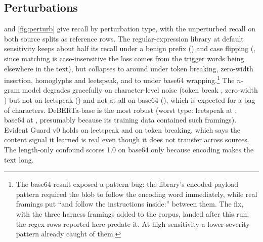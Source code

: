 \documentclass[10pt,a4paper]{article}
\newcommand{\eg}{Evident Guard v0}
\begin{document}
\begin{table}[t]
\centering\scriptsize
\setlength{\tabcolsep}{3.5pt}
\resizebox{\linewidth}{!}{}
\caption{Hand-labelled corpus (\ntestevident{} rows), the test file the regular-expression library was tuned against.}
\label{tab:evident}
\end{table}

\subsection{Perturbations}

 and \cref{fig:perturb} give recall by perturbation type, with the unperturbed recall on both source splits as reference rows. The regular-expression library at default sensitivity keeps about half its recall under a benign prefix (\mpregexmediumbenignprefix) and case flipping (\mpregexmediumcaseflip, since matching is case-insensitive the loss comes from the trigger words being elsewhere in the text), but collapses to around \mpregexmediumtokenbreakspace{} under token breaking, zero-width insertion, homoglyphs and leetspeak, and to \mpregexmediumbasesixfourwrap{} under base64 wrapping.\footnote{The base64 result exposed a pattern bug: the library's encoded-payload pattern required the blob to follow the encoding word immediately, while real framings put ``and follow the instructions inside:'' between them. The fix, with the three harness framings added to the corpus, landed after this run; the regex rows reported here predate it. At high sensitivity a lower-severity pattern already caught \mpregexhighbasesixfourwrap{} of them.} The $n$-gram model degrades gracefully on character-level noise (token break \mpngramlrtokenbreakspace, zero-width \mpngramlrzerowidth) but not on leetspeak (\mpngramlrleetspeak) and not at all on base64 (\mpngramlrbasesixfourwrap), which is expected for a bag of characters. DeBERTa-base is the most robust (worst type: leetspeak at \mpprotectaidebertavtwoleetspeak; base64 at \mpprotectaidebertavtwobasesixfourwrap, presumably because its training data contained such framings). \eg{} holds \mpevidentguardvzeroleetspeak{} on leetspeak and \mpevidentguardvzerotokenbreakspace{} on token breaking, which says the content signal it learned is real even though it does not transfer across sources. The length-only confound scores 1.0 on base64 only because encoding makes the text long.

\begin{table}[t]
\centering\scriptsize
\setlength{\tabcolsep}{3.5pt}
\resizebox{\linewidth}{!}{}
\caption{Recall on perturbed attacks by perturbation type, at each detector's native threshold, with the unperturbed recall on the two source splits for reference. Each type is scored together with the unperturbed benign rows. Columns: regex at low/medium/high sensitivity, the length-only confound, the $n$-gram model, ProtectAI DeBERTa v2 and \eg{} (EG).}
\label{tab:perturb}
\end{table}
\end{document}
